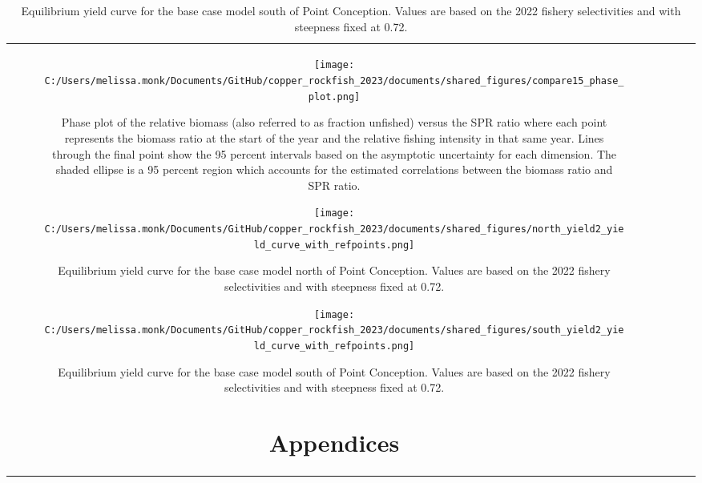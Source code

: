 \documentclass[11pt,
  letterpaper,
]{article}
\begin{document}
\begin{longtable}[t]{c>{\centering\arraybackslash}p{2cm}>{\centering\arraybackslash}p{2cm}>{\centering\arraybackslash}p{2cm}}
\clearpage

\begin{figure}
{\centering
\texttt{[image: C:/Users/melissa.monk/Documents/GitHub/copper\_rockfish\_2023/documents/shared\_figures/compare15\_phase\_plot.png]}
}
\caption{Phase plot of the relative biomass (also referred to as fraction unfished) versus the SPR ratio where each point represents the biomass ratio at the start of the year and the relative fishing intensity in that same year. Lines through the final point show the 95 percent intervals based on the asymptotic uncertainty for each dimension. The shaded ellipse is a 95 percent region which accounts for the estimated correlations between the biomass ratio and SPR ratio.\label{fig:phase}}
\end{figure}

\pagebreak

\begin{figure}
{\centering
\texttt{[image: C:/Users/melissa.monk/Documents/GitHub/copper\_rockfish\_2023/documents/shared\_figures/north\_yield2\_yield\_curve\_with\_refpoints.png]}
}
\caption{Equilibrium yield curve for the base case model north of Point Conception. Values are based on the 2022
fishery selectivities and with steepness fixed at 0.72.\label{fig:yield-north}}
\end{figure}

\pagebreak

\begin{figure}
{\centering
\texttt{[image: C:/Users/melissa.monk/Documents/GitHub/copper\_rockfish\_2023/documents/shared\_figures/south\_yield2\_yield\_curve\_with\_refpoints.png]}
}
\caption{Equilibrium yield curve for the base case model south of Point Conception. Values are based on the 2022
fishery selectivities and with steepness fixed at 0.72.\label{fig:yield-south}}
\end{figure}

\pagebreak

\section{Appendices}\label{appendices}


\end{longtable}
\end{document}
